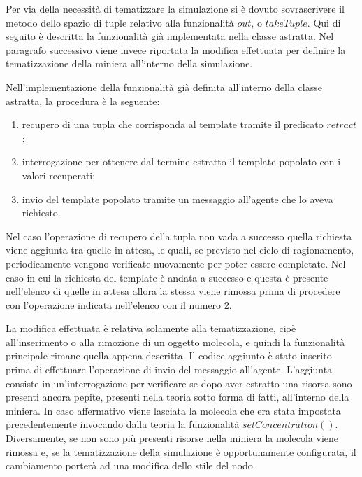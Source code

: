 Per via della necessità di tematizzare la simulazione si è dovuto sovrascrivere il metodo dello spazio di tuple relativo alla funzionalità $out$, o $takeTuple$.
Qui di seguito è descritta la funzionalità già implementata nella classe astratta. Nel paragrafo successivo viene invece riportata la modifica effettuata per definire la tematizzazione della miniera all'interno della simulazione.

Nell'implementazione della funzionalità già definita all'interno della classe astratta, la procedura è la seguente:
\begin{enumerate}
\item recupero di una tupla che corrisponda al template tramite il predicato $retract$;
\item interrogazione per ottenere dal termine estratto il template popolato con i valori recuperati;
\item invio del template popolato tramite un messaggio all'agente che lo aveva richiesto.
\end{enumerate}
Nel caso l'operazione di recupero della tupla non vada a successo quella richiesta viene aggiunta tra quelle in attesa, le quali, se previsto nel ciclo di ragionamento, periodicamente vengono verificate nuovamente per poter essere completate.
Nel caso in cui la richiesta del template è andata a successo e questa è presente nell'elenco di quelle in attesa allora la stessa viene rimossa prima di procedere con l'operazione indicata nell'elenco con il numero 2.

La modifica effettuata è relativa solamente alla tematizzazione, cioè all'inserimento o alla rimozione di un oggetto molecola, e quindi la funzionalità principale rimane quella appena descritta.
Il codice aggiunto è stato inserito prima di effettuare l'operazione di invio del messaggio all'agente. L'aggiunta consiste in un'interrogazione per verificare se dopo aver estratto una risorsa sono presenti ancora pepite, presenti nella teoria sotto forma di fatti, all'interno della miniera. In caso affermativo viene lasciata la molecola che era stata impostata precedentemente invocando dalla teoria la funzionalità $setConcentration()$. Diversamente, se non sono più presenti risorse nella miniera la molecola viene rimossa e, se la tematizzazione della simulazione è opportunamente configurata, il cambiamento porterà ad una modifica dello stile del nodo.

